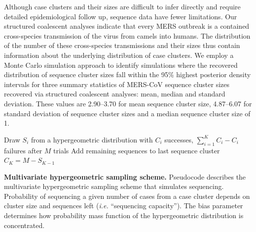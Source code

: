 \documentclass[11pt,oneside,letterpaper]{article}
\def\gdc#1{\textcolor{blue}{[#1]}}
\def\lmc#1{\textcolor{green}{[#1]}}
\begin{document}
Although case clusters and their sizes are difficult to infer directly and require detailed epidemiological follow up, sequence data have fewer limitations.%
Our structured coalescent analyses indicate that every MERS outbreak is a contained cross-species transmission of the virus from camels into humans.
The distribution of the number of these cross-species transmissions and their sizes thus contain information about the underlying distribution of case clusters.
We employ a Monte Carlo simulation approach to identify simulations where the recovered distribution of sequence cluster sizes fall within the 95\% highest posterior density intervals for three summary statistics of MERS-CoV sequence cluster sizes recovered via structured coalescent analyses: mean, median and standard deviation.
These values are 2.90--3.70 for mean sequence cluster size, 4.87--6.07 for standard deviation of sequence cluster sizes and a median sequence cluster size of 1.

\begin{algorithm}[H]
 Draw $S_{i}$ from a hypergeometric distribution with $C_{i}$ successes, $\sum_{i=1}^{K} C_{i}-C_{i}$ failures after $M$ trials\;
 Add remaining sequences to last sequence cluster $C_{K} = M - S_{K-1}$\;
 \caption{\textbf{Multivariate hypergeometric sampling scheme.}
 Pseudocode describes the multivariate hypergeometric sampling scheme that simulates sequencing.
 Probability of sequencing a given number of cases from a case cluster depends on cluster size and sequences left (\textit{i.e.} ``sequencing capacity'').
 The bias parameter determines how probability mass function of the hypergeometric distribution is concentrated.
 }
 \label{hypergeometric}
\end{algorithm}
\end{document}
